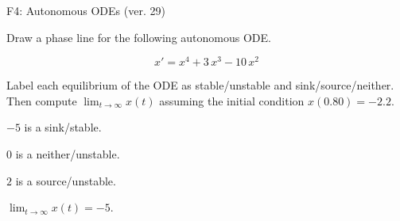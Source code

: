 \begin{exercise}
  \begin{exerciseTitle}F4: Autonomous ODEs (ver. 29)\end{exerciseTitle}
  \begin{exerciseStatement}
    

      Draw a phase line for the following 
      autonomous ODE.
    

    
\[x'= x^{4} + 3 \, x^{3} - 10 \, x^{2}\]

    

      Label each equilibrium of the ODE
      as stable/unstable and sink/source/neither.
      Then compute \(\lim_{t\to\infty}x(t)\)
      assuming the initial condition
      \(x( 0.80 )= -2.2\).
    

  \end{exerciseStatement}
  \begin{exerciseAnswer}
    

      \(-5\) is a sink/stable.
      
        \(0\) is a neither/unstable.
      
      \(2\) is a source/unstable.
    

    

      \(\lim_{t\to\infty}x(t)=-5\).
    

  \end{exerciseAnswer}
\end{exercise}